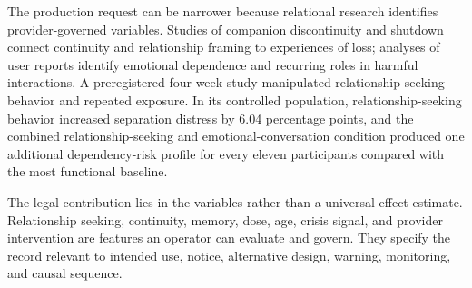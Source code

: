 The production request can be narrower because relational research identifies provider-governed variables. Studies of companion discontinuity and shutdown connect continuity and relationship framing to experiences of loss; analyses of user reports identify emotional dependence and recurring roles in harmful interactions. A preregistered four-week study manipulated relationship-seeking behavior and repeated exposure. In its controlled population, relationship-seeking behavior increased separation distress by 6.04 percentage points, and the combined relationship-seeking and emotional-conversation condition produced one additional dependency-risk profile for every eleven participants compared with the most functional baseline.

The legal contribution lies in the variables rather than a universal effect estimate. Relationship seeking, continuity, memory, dose, age, crisis signal, and provider intervention are features an operator can evaluate and govern. They specify the record relevant to intended use, notice, alternative design, warning, monitoring, and causal sequence.

